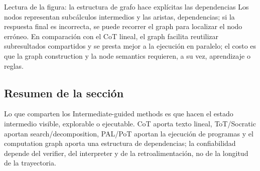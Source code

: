 
\begin{knowledgebox}{Lectura de la figura: la estructura de grafo hace explícitas las dependencias}
Los nodos representan subcálculos intermedios y las aristas, dependencias; si la respuesta final es incorrecta, se puede recorrer el graph para localizar el nodo erróneo. En comparación con el CoT lineal, el graph facilita reutilizar subresultados compartidos y se presta mejor a la ejecución en paralelo; el costo es que la graph construction y la node semantics requieren, a su vez, aprendizaje o reglas.
\end{knowledgebox}

\subsection{Resumen de la sección}

Lo que comparten los Intermediate-guided methods es que hacen el estado intermedio visible, explorable o ejecutable. CoT aporta texto lineal, ToT/Socratic aportan search/decomposition, PAL/PoT aportan la ejecución de programas y el computation graph aporta una estructura de dependencias; la confiabilidad depende del verifier, del interpreter y de la retroalimentación, no de la longitud de la trayectoria.
